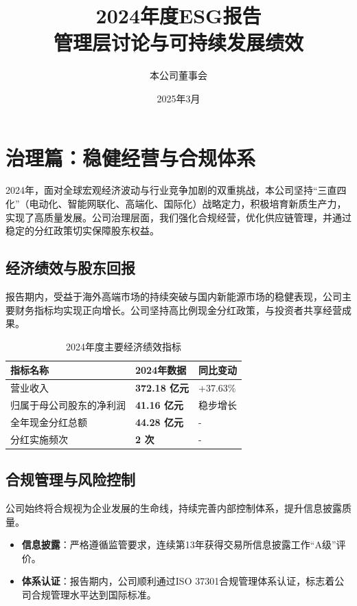 \documentclass[a4paper,12pt]{article}
\title{\textbf{2024年度ESG报告}\\ \large 管理层讨论与可持续发展绩效}
\author{本公司董事会}
\date{2025年3月}
\begin{document}
\maketitle

\section{治理篇：稳健经营与合规体系}

2024年，面对全球宏观经济波动与行业竞争加剧的双重挑战，本公司坚持“三直四化”（电动化、智能网联化、高端化、国际化）战略定力，积极培育新质生产力，实现了高质量发展。公司治理层面，我们强化合规经营，优化供应链管理，并通过稳定的分红政策切实保障股东权益。

\subsection{经济绩效与股东回报}
报告期内，受益于海外高端市场的持续突破与国内新能源市场的稳健表现，公司主要财务指标均实现正向增长。公司坚持高比例现金分红政策，与投资者共享经营成果。

\begin{table}[h]
\centering
\caption{2024年度主要经济绩效指标}
\renewcommand{\arraystretch}{1.4}
\begin{tabular}{p{} p{} p{}}
\toprule
\textbf{指标名称} & \textbf{2024年数据} & \textbf{同比变动} \\
\midrule
营业收入 & \textbf{372.18 亿元} & +37.63\% \\
归属于母公司股东的净利润 & \textbf{41.16 亿元} & 稳步增长 \\
全年现金分红总额 & \textbf{44.28 亿元} & - \\
分红实施频次 & \textbf{2 次} & - \\
\bottomrule
\end{tabular}
\end{table}

\subsection{合规管理与风险控制}
公司始终将合规视为企业发展的生命线，持续完善内部控制体系，提升信息披露质量。
\begin{itemize}
    \item \textbf{信息披露}：严格遵循监管要求，连续第13年获得交易所信息披露工作“A级”评价。
    \item \textbf{体系认证}：报告期内，公司顺利通过ISO 37301合规管理体系认证，标志着公司合规管理水平达到国际标准。
\end{itemize}
\end{document}
